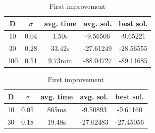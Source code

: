 \documentclass{article}
\begin{document}
\begin{table}[htbp]
\begin{minipage}{.4\linewidth}
    \centering

    \begin{tabular}{|c|c|c|c|c|}
    \hline
    D   & $\sigma$  & avg. time     & avg. sol.     & best sol. \\
    \hline
    10  & 0.04      & 1.50s         & -9.56506      & -9.65221 \\
    \hline
    30  & 0.28      & 33.42s        & -27.61249     & -28.56555 \\
    \hline
    100 & 0.51      & 9.73min       & -88.04727     & -89.11685 \\
    \hline
    \end{tabular}
    \caption{Best improvement}
  \end{minipage}%
  \quad %
  \begin{minipage}{.75\linewidth}
    \centering

    \begin{tabular}{|c|c|c|c|c|}
    \hline
    D   & $\sigma$  & avg. time     & avg. sol.     & best sol. \\
    \hline
    10  & 0.05      & 865ms         & -9.50893      & -9.61160 \\
    \hline
    30  & 0.18      & 19.48s        & -27.02483     & -27.45056 \\
    \hline
    \end{tabular}
    \caption{First improvement}
  \end{minipage}
\end{table}
\end{document}
